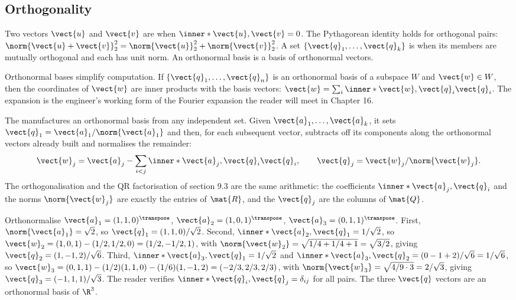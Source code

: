 \subsection{Orthogonality}

Two vectors $\vect{u}$ and $\vect{v}$ are  when
$\inner*{\vect{u}, \vect{v}} = 0$. The Pythagorean identity holds
for orthogonal pairs: $\norm{\vect{u} + \vect{v}}_{2}^{2} =
\norm{\vect{u}}_{2}^{2} + \norm{\vect{v}}_{2}^{2}$. A set
$\{\vect{q}_{1}, \ldots, \vect{q}_{k}\}$ is 
when its members are mutually orthogonal and each has unit norm.
An orthonormal basis is a basis of orthonormal vectors.

Orthonormal bases simplify computation. If $\{\vect{q}_{1}, \ldots,
\vect{q}_{n}\}$ is an orthonormal basis of a subspace $W$ and
$\vect{w} \in W$, then the coordinates of $\vect{w}$ are inner
products with the basis vectors: $\vect{w} = \sum_{i} \inner*{\vect{w},
\vect{q}_{i}}\vect{q}_{i}$. The expansion is the engineer's working
form of the Fourier expansion the reader will meet in
Chapter 16.

The  manufactures an orthonormal
basis from any independent set. Given $\vect{a}_{1}, \ldots,
\vect{a}_{k}$, it sets $\vect{q}_{1} = \vect{a}_{1}/\norm{\vect{a}_{1}}$
and then, for each subsequent vector, subtracts off its components
along the orthonormal vectors already built and normalises the
remainder:
\[
\vect{w}_{j} = \vect{a}_{j} - \sum_{i < j} \inner*{\vect{a}_{j},
\vect{q}_{i}}\vect{q}_{i}, \qquad \vect{q}_{j} = \vect{w}_{j}/
\norm{\vect{w}_{j}}.
\]
The orthogonalisation and the QR factorisation of section 9.3 are the
same arithmetic: the coefficients $\inner*{\vect{a}_{j}, \vect{q}_{i}}$
and the norms $\norm{\vect{w}_{j}}$ are exactly the entries of
$\mat{R}$, and the $\vect{q}_{j}$ are the columns of $\mat{Q}$.

\begin{example}
Orthonormalise $\vect{a}_{1} = (1, 1, 0)^{\transpose}$, $\vect{a}_{2}
= (1, 0, 1)^{\transpose}$, $\vect{a}_{3} = (0, 1, 1)^{\transpose}$.
First, $\norm{\vect{a}_{1}} = \sqrt{2}$, so $\vect{q}_{1} = (1, 1,
0)/\sqrt{2}$. Second, $\inner*{\vect{a}_{2}, \vect{q}_{1}} =
1/\sqrt{2}$, so $\vect{w}_{2} = (1, 0, 1) - (1/2, 1/2, 0) = (1/2,
-1/2, 1)$, with $\norm{\vect{w}_{2}} = \sqrt{1/4 + 1/4 + 1} =
\sqrt{3/2}$, giving $\vect{q}_{2} = (1, -1, 2)/\sqrt{6}$. Third,
$\inner*{\vect{a}_{3}, \vect{q}_{1}} = 1/\sqrt{2}$ and
$\inner*{\vect{a}_{3}, \vect{q}_{2}} = (0 - 1 + 2)/\sqrt{6} =
1/\sqrt{6}$, so $\vect{w}_{3} = (0, 1, 1) - (1/2)(1, 1, 0) -
(1/6)(1, -1, 2) = (-2/3, 2/3, 2/3)$, with $\norm{\vect{w}_{3}} =
\sqrt{4/9 \cdot 3} = 2/\sqrt{3}$, giving $\vect{q}_{3} = (-1, 1,
1)/\sqrt{3}$. The reader verifies $\inner*{\vect{q}_{i},
\vect{q}_{j}} = \delta_{ij}$ for all pairs. The three $\vect{q}$
vectors are an orthonormal basis of $\R^{3}$.
\end{example}

